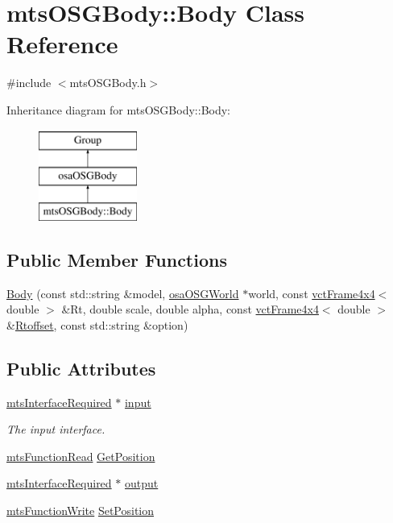 \hypertarget{classmts_o_s_g_body_1_1_body}{\section{mts\-O\-S\-G\-Body\-:\-:Body Class Reference}
\label{classmts_o_s_g_body_1_1_body}
}


{\ttfamily \#include $<$mts\-O\-S\-G\-Body.\-h$>$}

Inheritance diagram for mts\-O\-S\-G\-Body\-:\-:Body\-:\begin{figure}[H]
\begin{center}
\leavevmode
\includegraphics[height=3.000000cm]{d0/db8/classmts_o_s_g_body_1_1_body}
\end{center}
\end{figure}
\subsection*{Public Member Functions}
\begin{DoxyCompactItemize}
\item 
\hyperlink{classmts_o_s_g_body_1_1_body_a90f9629d468e6233a1f95ad531d8ef9e}{Body} (const std\-::string \&model, \hyperlink{classosa_o_s_g_world}{osa\-O\-S\-G\-World} $\ast$world, const \hyperlink{classvct_frame4x4}{vct\-Frame4x4}$<$ double $>$ \&Rt, double scale, double alpha, const \hyperlink{classvct_frame4x4}{vct\-Frame4x4}$<$ double $>$ \&\hyperlink{classosa_o_s_g_body_ad008984bdb0eda300948932eda13974a}{Rtoffset}, const std\-::string \&option)
\end{DoxyCompactItemize}
\subsection*{Public Attributes}
\begin{DoxyCompactItemize}
\item 
\hyperlink{classmts_interface_required}{mts\-Interface\-Required} $\ast$ \hyperlink{classmts_o_s_g_body_1_1_body_aa2d2a5a5c949a112419c36ebf4a8dd2a}{input}
\begin{DoxyCompactList}\small\item\em The input interface. \end{DoxyCompactList}\item 
\hyperlink{classmts_function_read}{mts\-Function\-Read} \hyperlink{classmts_o_s_g_body_1_1_body_a791a30456a61f93a32dbcc663cd4fc01}{Get\-Position}
\item 
\hyperlink{classmts_interface_required}{mts\-Interface\-Required} $\ast$ \hyperlink{classmts_o_s_g_body_1_1_body_a811a794749b145589bf15a97719166a7}{output}
\item 
\hyperlink{classmts_function_write}{mts\-Function\-Write} \hyperlink{classmts_o_s_g_body_1_1_body_a840993fc4f30facfdf722b7f0df04869}{Set\-Position}
\end{DoxyCompactItemize}
